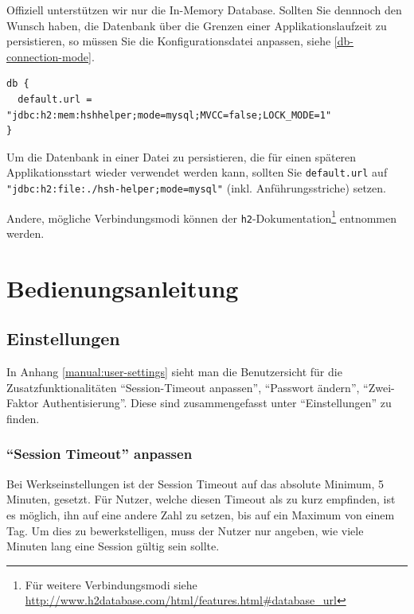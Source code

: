 \documentclass[12pt,DIV14,BCOR10mm,a4paper,parskip=half-,headsepline,headinclude,english,ngerman,bibliography=totocnumbered]{scrreprt}
\begin{document}
Offiziell unterstützen wir nur die In-Memory Database.
Sollten Sie dennnoch den Wunsch haben, die Datenbank über die Grenzen einer Applikationslaufzeit zu persistieren, so müssen Sie die Konfigurationsdatei anpassen, siehe \ref{db-connection-mode}.

\begin{lstlisting}[label=db-connection-mode, caption={Einstellung innerhalb der Konfigurationsdatei zum Anpassen des Verbindungsmodus der verwendeten Datenbank},captionpos=b]
db {
  default.url = "jdbc:h2:mem:hshhelper;mode=mysql;MVCC=false;LOCK_MODE=1"
}
\end{lstlisting}

\begin{sloppypar}
Um die Datenbank in einer Datei zu persistieren, die für einen späteren Applikationsstart wieder verwendet werden kann, sollten Sie \texttt{default.url} auf \texttt{"jdbc:h2:file:./hsh-helper;mode=mysql"} (inkl. Anführungsstriche) setzen.
\end{sloppypar}
Andere, mögliche Verbindungsmodi können der \texttt{h2}-Dokumentation\footnote{Für weitere Verbindungsmodi siehe \url{http://www.h2database.com/html/features.html\#database\_url}} entnommen werden.

\chapter{Bedienungsanleitung}

\section{Einstellungen}

In Anhang \autoref{manual:user-settings} sieht man die Benutzersicht für die Zusatzfunktionalitäten \enquote{Session-Timeout anpassen}, \enquote{Passwort ändern}, \enquote{Zwei-Faktor Authentisierung}.
Diese sind zusammengefasst unter \enquote{Einstellungen} zu finden.

\subsection{\enquote{Session Timeout} anpassen}

Bei Werkseinstellungen ist der Session Timeout auf das absolute Minimum, 5 Minuten, gesetzt.
Für Nutzer, welche diesen Timeout als zu kurz empfinden, ist es möglich, ihn auf eine andere Zahl zu setzen, bis auf ein Maximum von einem Tag.
Um dies zu bewerkstelligen, muss der Nutzer nur angeben, wie viele Minuten lang eine Session gültig sein sollte.
\end{document}
